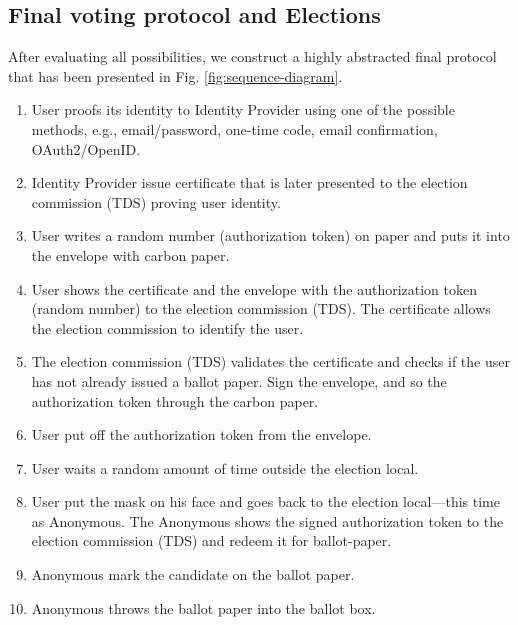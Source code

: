 \documentclass[applsci,article,submit,moreauthors,pdftex]{Definitions/mdpi}
\begin{document}
\subsection{Final voting protocol and Elections}
After evaluating all possibilities, we construct a highly abstracted final protocol that has been presented in Fig. \ref{fig:sequence-diagram}.
\begin{enumerate}
\item User proofs its identity to Identity Provider using one of the possible methods, e.g., email/password, one-time code, email confirmation, OAuth2/OpenID.
\item Identity Provider issue certificate that is later presented to the election commission (TDS) proving user identity.
\item User writes a random number (authorization token) on paper and puts it into the envelope with carbon paper.
\item User shows the certificate and the envelope with the authorization token (random number) to the election commission (TDS). The certificate allows the election commission to identify the user.
\item The election commission (TDS) validates the certificate and checks if the user has not already issued a ballot paper. Sign the envelope, and so the authorization token through the carbon paper.
\item User put off the authorization token from the envelope.
\item User waits a random amount of time outside the election local.
\item User put the mask on his face and goes back to the election local––this time as Anonymous. The Anonymous shows the signed authorization token to the election commission (TDS) and redeem it for ballot-paper.
\item Anonymous mark the candidate on the ballot paper.
\item Anonymous throws the ballot paper into the ballot box.
\end{enumerate}
\end{document}
